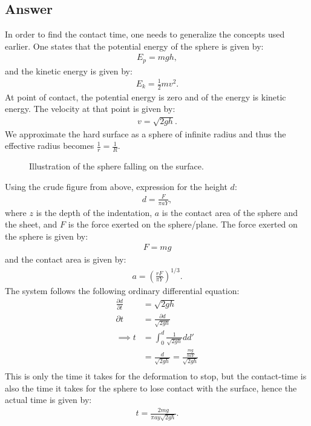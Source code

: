 \documentclass{article}
\begin{document}
\subsection*{Answer}
In order to find the contact time, one needs to generalize the concepts used earlier. One states that the potential energy of the sphere is given by:
\begin{align*}
    E_p = mgh,
\end{align*}and the kinetic energy is given by:
\begin{align*}
    E_k = \frac{1}{2}mv^2.
\end{align*}At point of contact, the potential energy is zero and of the energy is kinetic energy. The velocity at that point is given by:
\begin{align*}
    v = \sqrt{2gh}.
\end{align*}We approximate the hard surface as a sphere of infinite radius and thus the effective radius becomes $\frac{1}{r} = \frac{1}{R}$.
\begin{figure}[H]
    \centering
    \caption{Illustration of the sphere falling on the surface.}
    \label{fig: task4}
\end{figure}\noindent
Using the crude figure from above, expression for the height $d$:
\begin{align*}
    d = \frac{F}{\pi aY},
\end{align*}where $z$ is the depth of the indentation, $a$ is the contact area of the sphere and the sheet, and $F$ is the force exerted on the sphere/plane. The force exerted on the sphere is given by:
\begin{align*}
    F = mg
\end{align*}and the contact area is given by:
\begin{align*}
    a = \left(\frac{rF}{\pi Y}\right)^{1/3}.
\end{align*}
The system follows the following ordinary differential equation:
\begin{align*}
    \frac{\partial d}{\partial t} &= \sqrt{2gh}\\
    \partial t&=\frac{\partial d}{\sqrt{2gh}}\\
    \implies t &= \int_0^d\frac{1}{\sqrt{2gh}}dd'\\
    &= \frac{d}{\sqrt{2gh}} = \frac{\frac{mg}{\pi aY}}{\sqrt{2gh}}\\
\end{align*}This is only the time it takes for the deformation to stop, but the contact-time is also the time it takes for the sphere to lose contact with the surface, hence the actual time is given by:
\begin{align*}
    t = \frac{2mg}{\pi ay\sqrt{2gh}}.
\end{align*}
\end{document}

